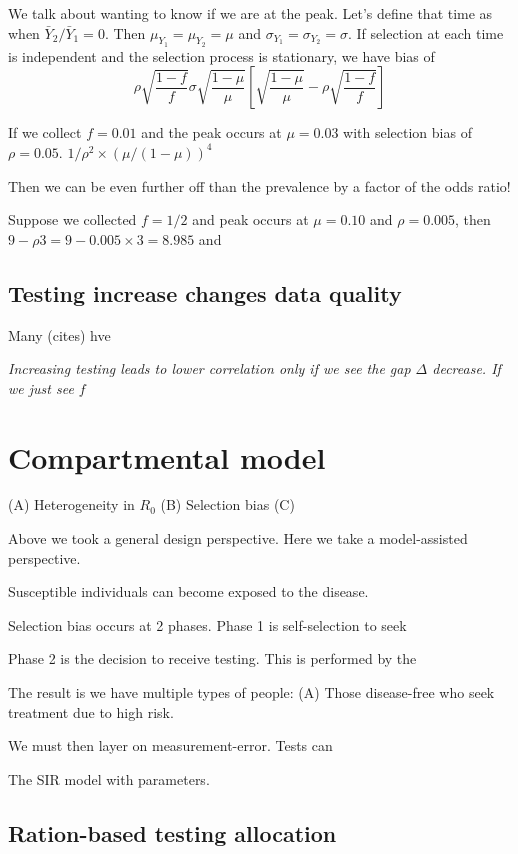 \documentclass[12pt]{article}
\numberwithin{equation}{section}
\theoremstyle{plain}
\begin{document}
We talk about wanting to know if we are at the peak.  Let's define that time as when $\bar Y_2 / \bar Y_1 = 0$.  Then $\mu_{Y_1} = \mu_{Y_2} = \mu$ and $\sigma_{Y_1} = \sigma_{Y_2} = \sigma$. If selection at each time is independent and the selection process is stationary, we have bias of
$$
\rho \sqrt{\frac{1-f}{f}} \sigma \sqrt{\frac{1-\mu}{\mu}} \left[ \sqrt{\frac{1-\mu}{\mu}} - \rho \sqrt{\frac{1-f}{f}} \right ]
$$

If we collect $f = 0.01$ and the peak occurs at $\mu = 0.03$ with selection bias of $\rho = 0.05$. $1/\rho^2 \times (\mu/(1-\mu))^4$

Then we can be even further off than the prevalence by a factor of the odds ratio!

Suppose we collected $f=1/2$ and peak occurs at $\mu = 0.10$ and $\rho = 0.005$, then $9-\rho 3 = 9 - 0.005 \times 3 = 8.985$ and

\subsection{Testing increase changes data quality}

Many (cites) hve

\emph{Increasing testing leads to lower correlation only if we see the gap $\Delta$ decrease.  If we just see $f$ }


\section{Compartmental model}

(A) Heterogeneity in $R_0$
(B) Selection bias
(C)

Above we took a general design perspective.  Here we take a model-assisted perspective.

Susceptible individuals can become exposed to the disease.

Selection bias occurs at 2 phases. Phase 1 is self-selection to seek

Phase 2 is the decision to receive testing.  This is performed by the

The result is we have multiple types of people: (A) Those disease-free who seek treatment due to high risk.

We must then layer on measurement-error.  Tests can

The SIR model with parameters.

\subsection{Ration-based testing allocation}
\end{document}

